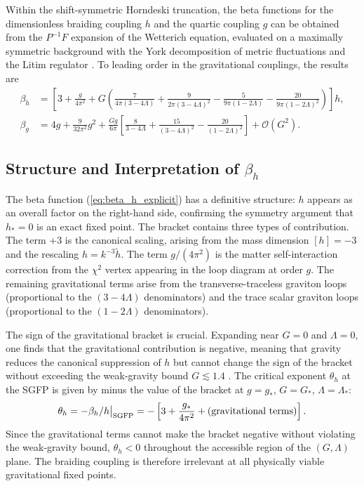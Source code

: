 \documentclass[12pt,a4paper]{article}
\begin{document}
Within the shift-symmetric Horndeski truncation, the beta functions for the
dimensionless braiding coupling $h$ and the quartic coupling $g$ can be
obtained from the $P^{-1}F$ expansion of the Wetterich equation, evaluated
on a maximally symmetric background with the York decomposition of metric
fluctuations and the Litim regulator \cite{EichhornLinoWagner2023}. To leading
order in the gravitational couplings, the results are
\begin{align}
\beta_h &= \left[3 + \frac{g}{4\pi^2}
+ G\!\left(\frac{7}{4\pi(3-4\Lambda)}
+ \frac{9}{2\pi(3-4\Lambda)^2}
- \frac{5}{9\pi(1-2\Lambda)}
- \frac{20}{9\pi(1-2\Lambda)^2}\right)
\right]h,
\label{eq:beta_h_explicit}
\\[6pt]
\beta_g &= 4g + \frac{9}{32\pi^2}g^2
+ \frac{Gg}{6\pi}\left[
\frac{8}{3-4\Lambda}
+ \frac{15}{(3-4\Lambda)^2}
- \frac{20}{(1-2\Lambda)^2}
\right] + \mathcal{O}(G^2).
\label{eq:beta_g_explicit}
\end{align}

\subsection{Structure and Interpretation of $\beta_h$}

The beta function (\ref{eq:beta_h_explicit}) has a definitive structure: $h$
appears as an overall factor on the right-hand side, confirming the symmetry
argument that $h_* = 0$ is an exact fixed point. The bracket contains three
types of contribution. The term $+3$ is the canonical scaling, arising from
the mass dimension $[h] = -3$ and the rescaling $h = k^{-3}\tilde h$. The
term $g/(4\pi^2)$ is the matter self-interaction correction from the $\chi^2$
vertex appearing in the loop diagram at order $g$. The remaining gravitational
terms arise from the transverse-traceless graviton loops (proportional to the
$(3-4\Lambda)$ denominators) and the trace scalar graviton loops (proportional
to the $(1-2\Lambda)$ denominators).

The sign of the gravitational bracket is crucial. Expanding near $G = 0$ and
$\Lambda = 0$, one finds that the gravitational contribution is negative,
meaning that gravity reduces the canonical suppression of $h$ but cannot change
the sign of the bracket without exceeding the weak-gravity bound
$G \lesssim 1.4$ \cite{EichhornLinoWagner2023,EichhornSchiffer2022handbook}.
The critical exponent $\theta_h$ at the SGFP is given by minus the value of
the bracket at $g = g_*$, $G = G_*$, $\Lambda = \Lambda_*$:
\begin{equation}
\theta_h = -\beta_h/h\big|_{\rm SGFP}
= -\left[3 + \frac{g_*}{4\pi^2} + (\text{gravitational terms})\right].
\end{equation}
Since the gravitational terms cannot make the bracket negative without
violating the weak-gravity bound, $\theta_h < 0$ throughout the accessible
region of the $(G,\Lambda)$ plane. The braiding coupling is therefore
irrelevant at all physically viable gravitational fixed points.
\end{document}
